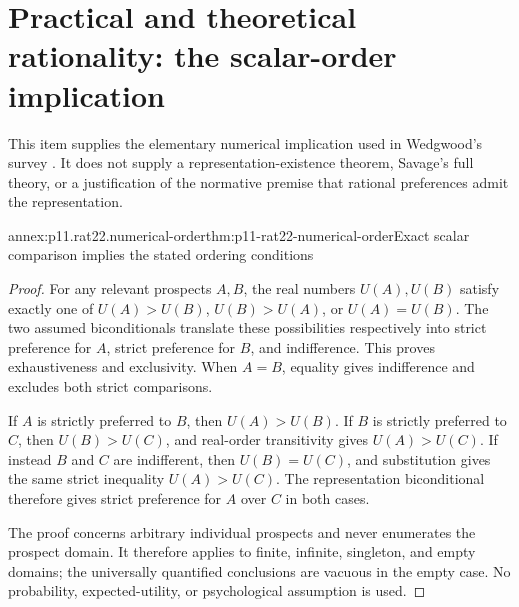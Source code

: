 \section{Practical and theoretical rationality: the scalar-order implication}
\label{sec:p11-rat22-numerical-order-annex}

This item supplies the elementary numerical implication used in Wedgwood's
survey \parencite[p.~140]{RalphWedgwood2021}. It does not supply a
representation-existence theorem, Savage's full theory, or a justification
of the normative premise that rational preferences admit the representation.

\begin{annexitem}{annex:p11.rat22.numerical-order}{thm:p11-rat22-numerical-order}{Exact scalar comparison implies the stated ordering conditions}
\begin{proof}
For any relevant prospects \(A,B\), the real numbers \(U(A),U(B)\)
satisfy exactly one of \(U(A)>U(B)\), \(U(B)>U(A)\), or
\(U(A)=U(B)\). The two assumed biconditionals translate these possibilities
respectively into strict preference for \(A\), strict preference for \(B\),
and indifference. This proves exhaustiveness and exclusivity. When
\(A=B\), equality gives indifference and excludes both strict comparisons.

If \(A\) is strictly preferred to \(B\), then \(U(A)>U(B)\). If \(B\)
is strictly preferred to \(C\), then \(U(B)>U(C)\), and real-order
transitivity gives \(U(A)>U(C)\). If instead \(B\) and \(C\) are
indifferent, then \(U(B)=U(C)\), and substitution gives the same strict
inequality \(U(A)>U(C)\). The representation biconditional therefore
gives strict preference for \(A\) over \(C\) in both cases.

The proof concerns arbitrary individual prospects and never enumerates
the prospect domain. It therefore applies to finite, infinite, singleton,
and empty domains; the universally quantified conclusions are vacuous
in the empty case. No probability, expected-utility, or psychological
assumption is used.
\end{proof}
\end{annexitem}
